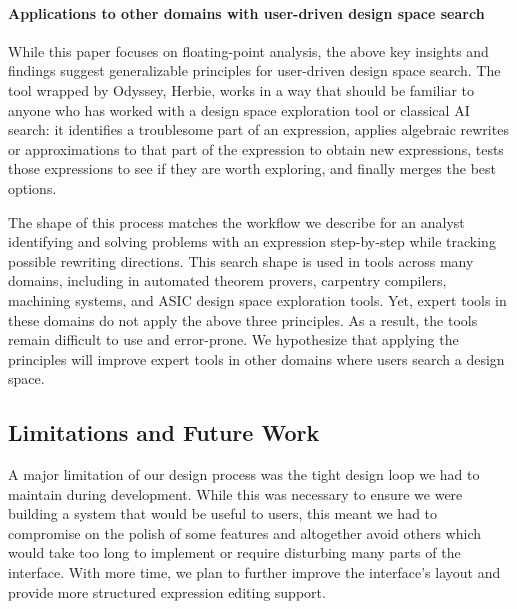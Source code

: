 \paragraph{Applications to other domains with user-driven design space search}
While this paper focuses on floating-point analysis, 
the above key insights and findings suggest generalizable principles for user-driven design space search. 
The tool wrapped by Odyssey, Herbie, works in a way that should be 
familiar to anyone who has worked with a design space exploration tool
or classical AI search:
  it identifies a troublesome part of an expression, 
  applies algebraic rewrites or approximations to that part of the expression to obtain new expressions, 
  tests those expressions to see if they are worth exploring, 
  and finally merges the best options.

The shape of this process 
  matches the workflow we describe for an analyst 
  identifying and solving problems with an expression step-by-step 
  while tracking possible rewriting directions.
This search shape is used in tools across many domains,
  including in automated theorem provers, carpentry compilers,
  machining systems, and ASIC design space exploration tools. 
  Yet, expert tools in these domains do not apply the above three principles. 
  As a result, the tools remain difficult to use and error-prone. 
  We hypothesize that applying the principles will improve expert tools in other domains where users search a design space. 


\subsection{Limitations and Future Work} 

A major limitation of our design process was the tight design loop 
  we had to maintain during development. 
While this was necessary to ensure
  we were building a system that would be useful to users, this meant
  we had to compromise on the polish of some features and 
  altogether avoid others which would take too long to implement or require
  disturbing many parts of the interface.
With more time, we plan to further improve the interface's layout and
  provide more structured expression editing support.

